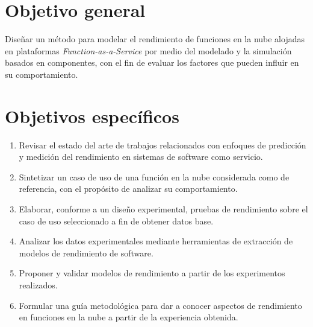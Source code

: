 \section{Objetivo general}
Diseñar un método para modelar el rendimiento de funciones en la nube alojadas en plataformas \emph{Function-as-a-Service} por medio del modelado y la simulación basados en componentes, con el fin de evaluar los factores que pueden influir en su comportamiento. 

\section{Objetivos específicos}
\begin{enumerate}
    \item Revisar el estado del arte de trabajos relacionados con enfoques de predicción y medición del rendimiento en sistemas de software como servicio.\label{sec:obj1}
    \item Sintetizar un caso de uso de una función en la nube considerada como de referencia, con el propósito de analizar su comportamiento.\label{sec:obj2}
    \item Elaborar, conforme a un diseño experimental, pruebas de rendimiento sobre el caso de uso seleccionado a fin de obtener datos base.\label{sec:obj3}
    \item Analizar los datos experimentales mediante herramientas de extracción de modelos de rendimiento de software.\label{sec:obj4}
    \item Proponer y validar modelos de rendimiento a partir de los experimentos realizados. \label{sec:obj5}       
    \item Formular una guía metodológica para dar a conocer aspectos de rendimiento en funciones en la nube a partir de la experiencia obtenida. \label{sec:obj6}
\end{enumerate}